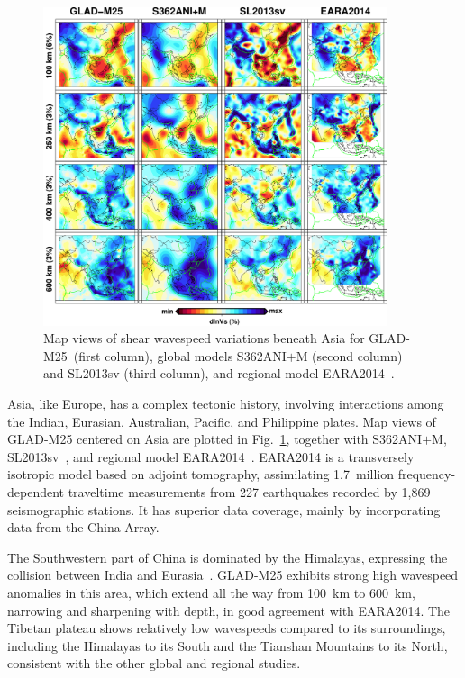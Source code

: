 \documentclass[extra,mreferee]{gji}
\begin{document}
\begin{figure}[ht!]
  \includegraphics[width=0.9\textwidth]{figures/depth_slice/asia_vs.pdf}
  \caption{\small{Map views of shear wavespeed variations beneath Asia for GLAD-M25~(first column),
  global models S362ANI$+$M (second column) and SL2013sv (third column), and regional model EARA2014~\citep[last column;][]{chen2015multiparameter}.}}
  \label{fig:asia-vs}
  \centering
\end{figure}

Asia, like Europe, has a complex tectonic history, involving
interactions among the Indian, Eurasian, Australian, Pacific, and Philippine
plates.
Map views of GLAD-M25 centered on Asia are plotted in Fig.~\ref{fig:asia-vs},
together with S362ANI$+$M, SL2013sv~\citep{SchaefferLebedev13}, and regional model EARA2014~\citep{chen2015multiparameter}.
EARA2014 is a transversely isotropic model based on adjoint
tomography, assimilating 1.7~million frequency-dependent traveltime
measurements from 227 earthquakes recorded by 1,869 seismographic  stations.
It has superior data coverage, mainly by incorporating data from the China Array.

The Southwestern part of China is dominated by the Himalayas,
expressing the collision between India and Eurasia~\citep{lebedev2003upper}.
GLAD-M25 exhibits strong high wavespeed anomalies in this area,
which extend all the way from 100~km to 600~km, narrowing and sharpening with depth,
in good agreement with EARA2014.
The Tibetan plateau shows relatively low wavespeeds
compared to its surroundings, including the Himalayas to its South and
the Tianshan Mountains to its North, consistent with the other global
and regional studies.
\end{document}
